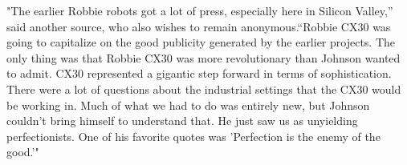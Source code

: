 "The earlier Robbie robots got a lot of press, especially here in Silicon Valley,'' said another source, who also wishes to remain anonymous.``Robbie CX30 was going to capitalize on the good publicity generated by the earlier projects. The only thing was that Robbie CX30 was more revolutionary than Johnson wanted to admit. CX30 represented a gigantic step forward in terms of sophistication. There were a lot of questions about the industrial settings that the CX30 would be working in. Much of what we had to do was entirely new, but Johnson couldn't bring himself to understand that. He just saw us as unyielding perfectionists. One of his favorite quotes was 'Perfection is the enemy of the good.'"
